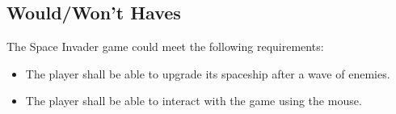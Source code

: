 \subsection{Would/Won't Haves}
The Space Invader game could meet the following requirements:
\begin{itemize}
	\item The player shall be able to upgrade its spaceship after a wave of enemies.
	\item The player shall be able to interact with the game using the mouse.
\end{itemize}
